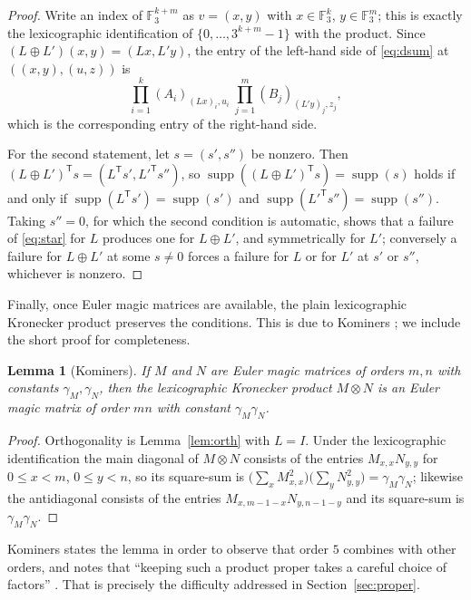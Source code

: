 \documentclass[11pt,a4paper]{amsart}
\theoremstyle{plain}
\newtheorem{lemma}[theorem]{Lemma}
\theoremstyle{definition}
\theoremstyle{remark}
\newcommand{\FF}{\mathbb{F}}
\newcommand{\supp}{\operatorname{supp}}
\newcommand{\tr}{\mathsf{T}}
\begin{document}
\begin{proof}
Write an index of $\FF_3^{k+m}$ as $v=(x,y)$ with $x\in\FF_3^k$, $y\in\FF_3^m$;
this is exactly the lexicographic identification of $\{0,\dots,3^{k+m}-1\}$ with
the product. Since $(L\oplus L')(x,y)=(Lx,L'y)$, the entry of the left-hand side
of \eqref{eq:dsum} at $((x,y),(u,z))$ is
\[
\prod_{i=1}^{k}(A_i)_{(Lx)_i,u_i}\ \prod_{j=1}^{m}(B_j)_{(L'y)_j,z_j},
\]
which is the corresponding entry of the right-hand side.

For the second statement, let $s=(s',s'')$ be nonzero. Then
$(L\oplus L')^{\tr}s=(L^{\tr}s',L'^{\tr}s'')$, so
$\supp((L\oplus L')^{\tr}s)=\supp(s)$ holds if and only if
$\supp(L^{\tr}s')=\supp(s')$ and $\supp(L'^{\tr}s'')=\supp(s'')$. Taking
$s''=0$, for which the second condition is automatic, shows that a failure of
\eqref{eq:star} for $L$ produces one for $L\oplus L'$, and symmetrically for
$L'$; conversely a failure for $L\oplus L'$ at some $s\ne0$ forces a failure for
$L$ or for $L'$ at $s'$ or $s''$, whichever is nonzero.
\end{proof}

Finally, once Euler magic matrices are available, the plain lexicographic
Kronecker product preserves the conditions. This is due to
Kominers \cite[\S5]{Kominers2026}; we include the short proof for completeness.

\begin{lemma}[Kominers]\label{lem:compose}
If $M$ and $N$ are Euler magic matrices of orders $m,n$ with constants
$\gamma_M,\gamma_N$, then the lexicographic Kronecker product $M\otimes N$ is an
Euler magic matrix of order $mn$ with constant $\gamma_M\gamma_N$.
\end{lemma}

\begin{proof}
Orthogonality is Lemma~\ref{lem:orth} with $L=I$. Under the lexicographic
identification the main diagonal of $M\otimes N$ consists of the entries
$M_{x,x}N_{y,y}$ for $0\le x<m$, $0\le y<n$, so its square-sum is
$\big(\sum_x M_{x,x}^2\big)\big(\sum_y N_{y,y}^2\big)=\gamma_M\gamma_N$;
likewise the antidiagonal consists of the entries
$M_{x,m-1-x}N_{y,n-1-y}$ and its square-sum is $\gamma_M\gamma_N$.
\end{proof}

Kominers states the lemma in order to observe that order $5$ combines with other
orders, and notes that ``keeping such a product proper takes a careful choice of
factors'' \cite[\S5]{Kominers2026}. That is precisely the difficulty addressed in
Section~\ref{sec:proper}.
\end{document}
